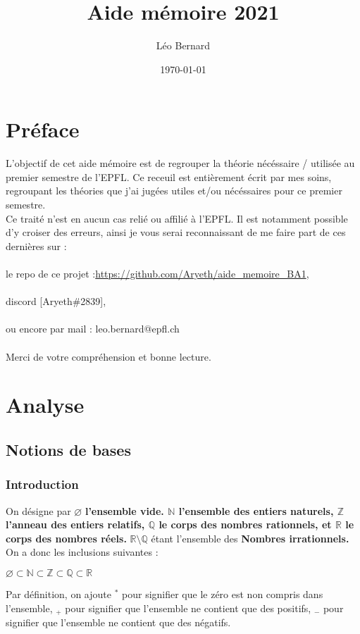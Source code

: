 \documentclass[12pt, a4paper]{book}
\title{Aide mémoire 2021}
\date{\today}
\author{Léo Bernard}
\let\emptyset\varnothing
\begin{document}
\maketitle
\chapter*{Préface}
L'objectif de cet aide mémoire est de regrouper la théorie nécéssaire / utilisée au premier semestre de l'EPFL.
Ce receuil est entièrement écrit par mes soins, regroupant les théories que j'ai jugées utiles et/ou nécéssaires pour ce premier semestre.\\
Ce traité n'est en aucun cas relié ou affilié à l'EPFL. Il est notamment possible d'y croiser des erreurs, ainsi je vous serai reconnaissant
de me faire part de ces dernières sur :\\
\ \\
le repo de ce projet :\url{https://github.com/Aryeth/aide_memoire_BA1},\\
\ \\
discord [Aryeth\#2839],\\
\ \\
ou encore par mail : leo.bernard@epfl.ch\\
\ \\
Merci de votre compréhension et bonne lecture.
\tableofcontents

\chapter{Analyse}
\section{Notions de bases}
\subsection{Introduction}
On désigne par $\emptyset$ \textbf{l'ensemble vide. $\mathbb{N}$ l'ensemble des entiers naturels, $\mathbb{Z}$ l'anneau des entiers relatifs, $\mathbb{Q}$ le corps des nombres rationnels, et $\mathbb{R}$ le corps des nombres réels.} $\mathbb{R} \setminus \mathbb{Q}$ étant l'ensemble des \textbf{Nombres irrationnels.} On a donc les inclusions suivantes :\\
\begin{center}
    $\emptyset \subset \mathbb{N} \subset \mathbb{Z} \subset \mathbb{Q} \subset \mathbb{R}$
\end{center}
Par définition, on ajoute ${}^*$ pour signifier que le zéro est non compris dans l'ensemble, ${}_+$ pour signifier que l'ensemble ne contient que des positifs, ${}_-$ pour signifier que l'ensemble ne contient que des négatifs.
\end{document}
